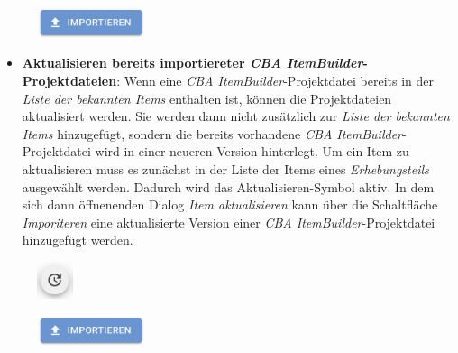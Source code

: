 \documentclass[
  letterpaper,
  DIV=11]{scrreprt}
\providecommand{\tightlist}{%
  \setlength{\itemsep}{0pt}\setlength{\parskip}{0pt}}\usepackage{longtable,booktabs,array}
\begin{document}
\begin{tcolorbox}
\begin{figure}[H]
\end{figure}

\begin{figure}[H]

\includegraphics[width=1.25in,height=\textheight]{img/screenshot-import-items-button-01.png} \hfill{}

\end{figure}

\begin{itemize}
\tightlist
\item
  \textbf{Aktualisieren bereits importiereter \emph{CBA
  ItemBuilder}-Projektdateien}: Wenn eine \emph{CBA
  ItemBuilder}-Projektdatei bereits in der \emph{Liste der bekannten
  Items} enthalten ist, können die Projektdateien aktualisiert werden.
  Sie werden dann nicht zusätzlich zur \emph{Liste der bekannten Items}
  hinzugefügt, sondern die bereits vorhandene \emph{CBA
  ItemBuilder}-Projektdatei wird in einer neueren Version hinterlegt. Um
  ein Item zu aktualisieren muss es zunächst in der Liste der Items
  eines \emph{Erhebungsteils} ausgewählt werden. Dadurch wird das
  Aktualisieren-Symbol aktiv. In dem sich dann öffnenenden Dialog
  \emph{Item aktualisieren} kann über die Schaltfläche
  \emph{Imporiteren} eine aktualisierte Version einer \emph{CBA
  ItemBuilder}-Projektdatei hinzugefügt werden.
\end{itemize}

\begin{figure}[H]

\includegraphics[width=0.41667in,height=\textheight]{img/screenshot-update-item-icon-01.png} \hfill{}

\end{figure}

\begin{figure}[H]

\includegraphics[width=1.25in,height=\textheight]{img/screenshot-import-items-button-01.png} \hfill{}

\end{figure}


\end{tcolorbox}
\end{document}
